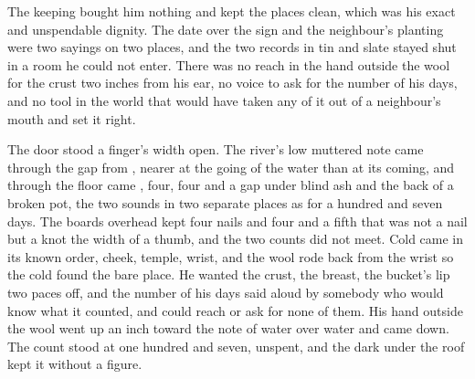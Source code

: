 The keeping bought him nothing and kept the places clean, which was his exact and unspendable dignity. The date over the sign and the neighbour's planting were two sayings on two places, and the two records in tin and slate stayed shut in a room he could not enter. There was no reach in the hand outside the wool for the crust two inches from his ear, no voice to ask for the number of his days, and no tool in the world that would have taken any of it out of a neighbour's mouth and set it right.

The door stood a finger's width open. The river's low muttered note came through the gap from , nearer at the going of the water than at its coming, and through the floor came , four, four and a gap under blind ash and the back of a broken pot, the two sounds in two separate places as for a hundred and seven days. The boards overhead kept four nails and four and a fifth that was not a nail but a knot the width of a thumb, and the two counts did not meet. Cold came in its known order, cheek, temple, wrist, and the wool rode back from the wrist so the cold found the bare place. He wanted the crust, the breast, the bucket's lip two paces off, and the number of his days said aloud by somebody who would know what it counted, and could reach or ask for none of them. His hand outside the wool went up an inch toward the note of water over water and came down. The count stood at one hundred and seven, unspent, and the dark under the roof kept it without a figure.
